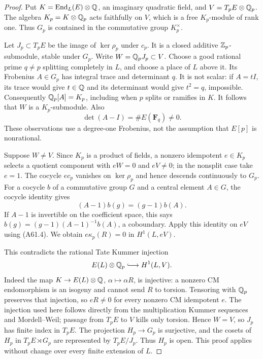 \begin{proof}
Put $K=\operatorname{End}_L(E)\otimes\mathbb Q$, an imaginary quadratic
field, and $V=T_pE\otimes\mathbb Q_p$. The algebra $K_p=K\otimes\mathbb Q_p$
acts faithfully on $V$, which is a free $K_p$-module of rank one.
Thus $G_p$ is contained in the commutative group $K_p^\times$.

Let $J_p\subset T_pE$ be the image of $\ker\rho_p$ under $c_p$.
It is a closed additive $\mathbb Z_p$-submodule, stable under $G_p$.
Write $W=\mathbb Q_p J_p\subset V$. Choose a good rational prime
$q\ne p$ splitting completely in $L$, and choose a place of $L$
above it. Its Frobenius $A\in G_p$ has integral trace and
determinant $q$. It is not scalar: if $A=tI$, its trace would give
$t\in\mathbb Q$ and its determinant would give $t^2=q$, impossible.
Consequently $\mathbb Q_p[A]=K_p$, including when $p$ splits or ramifies
in $K$. It follows that $W$ is a $K_p$-submodule. Also
\[
 \det(A-I)=\#E(\mathbf F_q)\ne0.
 \tag{A61.4}
\]
These observations use a degree-one Frobenius, not the assumption
that $E[p]$ is nonrational.

Suppose $W\ne V$. Since $K_p$ is a product of fields, a nonzero
idempotent $e\in K_p$ selects a quotient component with
$eW=0$ and $eV\ne0$; in the nonsplit case take $e=1$.
The cocycle $ec_p$ vanishes on $\ker\rho_p$ and hence descends
continuously to $G_p$. For a cocycle $b$ of a commutative group
$G$ and a central element $A\in G$, the cocycle identity gives
\[
 (A-1)b(g)=(g-1)b(A).
\]
If $A-1$ is invertible on the coefficient space, this says
$b(g)=(g-1)(A-1)^{-1}b(A)$, a coboundary. Apply this identity
on $eV$ using (A61.4). We obtain $e\kappa_p(R)=0$ in
$H^1(L,eV)$.

This contradicts the rational Tate Kummer injection
\[
 E(L)\otimes\Q_p\lhook\joinrel\longrightarrow H^1(L,V).
\]
Indeed the map $K\to E(L)\otimes\mathbb Q$, $\alpha\mapsto\alpha R$,
is injective: a nonzero CM endomorphism is an isogeny and cannot
send $R$ to torsion. Tensoring with $\mathbb Q_p$ preserves that
injection, so $eR\ne0$ for every nonzero CM idempotent $e$.
The injection used here follows directly from the multiplication
Kummer sequences and Mordell--Weil; passage from $T_pE$ to $V$
kills only torsion. Hence $W=V$, so $J_p$ has finite index in
$T_pE$. The projection $H_p\to G_p$ is surjective, and the
cosets of $H_p$ in $T_pE\rtimes G_p$ are represented by
$T_pE/J_p$. Thus $H_p$ is open. This proof applies without
change over every finite extension of $L$.


\end{proof}
